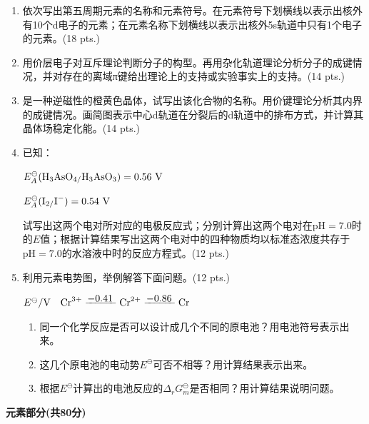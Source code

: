 \begin{enumerate}[label=\arabic*., start=1, itemsep=1.5ex]
    \item 依次写出第五周期元素的名称和元素符号。在元素符号下划横线以表示出核外有10个d电子的元素；在元素名称下划横线以表示出核外5s轨道中只有1个电子的元素。(18 pts.)

    \item 用价层电子对互斥理论判断分子的构型。再用杂化轨道理论分析分子的成键情况，并对存在的离域π键给出理论上的支持或实验事实上的支持。(14 pts.)

    \item {}是一种逆磁性的橙黄色晶体，试写出该化合物的名称。用价键理论分析其内界的成键情况。画简图表示中心d轨道在分裂后的d轨道中的排布方式，并计算其晶体场稳定化能。(14 pts.)

    \item 已知：

        $E^\ominus_A(\ce{H3AsO4/H3AsO3}) = 0.56\ \text{V}$

        $E^\ominus_A(\ce{I2/I^-}) = 0.54\ \text{V}$

        试写出这两个电对所对应的电极反应式；分别计算出这两个电对在$\text{pH}=7.0$时的$E$值；根据计算结果写出这两个电对中的四种物质均以标准态浓度共存于$\text{pH}=7.0$的水溶液中时的反应方程式。(12 pts.)

    \item 利用元素电势图，举例解答下面问题。(12 pts.)
    
    $E^\ominus/\text{V} \quad 
    \ce{Cr^{3+}} 
    \xline{\raisebox{0.5ex}{$-0.41$}} 
    \ce{Cr^{2+}} 
    \xline{\raisebox{0.5ex}{$-0.86$}} 
    \ce{Cr}$

    \begin{enumerate}[label=(\arabic*), itemsep=1ex]
        \item 同一个化学反应是否可以设计成几个不同的原电池？用电池符号表示出来。
        \item 这几个原电池的电动势$E^\ominus$可否不相等？用计算结果表示出来。
        \item 根据$E^\ominus$计算出的电池反应的$\Delta_r G_m^\ominus$是否相同？用计算结果说明问题。
    \end{enumerate}

\end{enumerate}

\vspace{1cm}
\begin{center}
    {\Large \textbf{元素部分(共80分)}}
\end{center}

